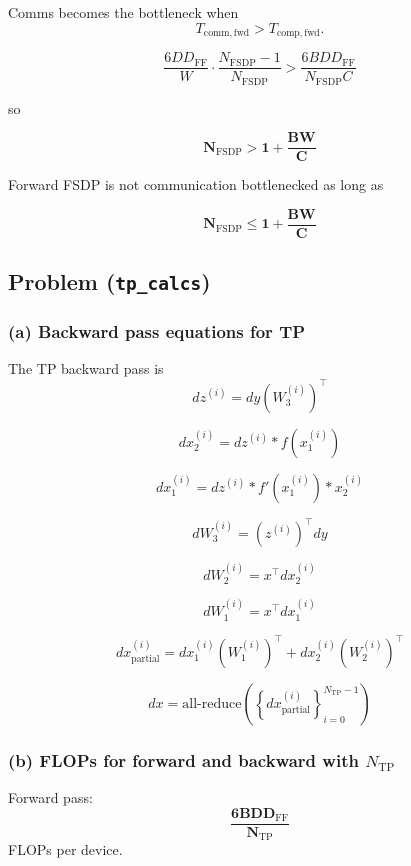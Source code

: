 \documentclass[11pt]{article}
\begin{document}
Comms becomes the bottleneck when
\[
T_{\mathrm{comm,fwd}} > T_{\mathrm{comp,fwd}}.
\]

\[
\frac{6 D D_{\mathrm{FF}}}{W}
\cdot
\frac{N_{\mathrm{FSDP}} - 1}{N_{\mathrm{FSDP}}}
>
\frac{6 B D D_{\mathrm{FF}}}{N_{\mathrm{FSDP}} C}
\]

so

\[
\mathbf{
N_{\mathrm{FSDP}} > 1 + \frac{B W}{C}
}
\]

Forward FSDP is not communication bottlenecked as long as

\[
\mathbf{
N_{\mathrm{FSDP}} \le 1 + \frac{B W}{C}
}
\]

\vspace{4em}


\subsection{Problem (\texttt{tp\_calcs})}

\subsubsection*{(a) Backward pass equations for TP}

The TP backward pass is
\[
d z^{(i)}
=
d y \left(W_3^{(i)}\right)^\top
\]

\[
d x_2^{(i)}
=
d z^{(i)} * f(x_1^{(i)})
\]

\[
d x_1^{(i)}
=
d z^{(i)} * f'(x_1^{(i)}) * x_2^{(i)}
\]

\[
dW_3^{(i)}
=
\left(z^{(i)}\right)^\top d y
\]

\[
dW_2^{(i)}
=
x^\top d x_2^{(i)}
\]

\[
dW_1^{(i)}
=
x^\top d x_1^{(i)}
\]

\[
d x_{\mathrm{partial}}^{(i)}
=
d x_1^{(i)} \left(W_1^{(i)}\right)^\top
+
d x_2^{(i)} \left(W_2^{(i)}\right)^\top
\]

\[
d x
=
\mathrm{all\text{-}reduce}
\left(
\left\{
d x_{\mathrm{partial}}^{(i)}
\right\}_{i=0}^{N_{\mathrm{TP}}-1}
\right)
\]

\vspace{4em}

\subsubsection*{(b) FLOPs for forward and backward with $N_{\text{TP}}$}

Forward pass:
\[
\mathbf{
\frac{6 B D D_{\mathrm{FF}}}{N_{\mathrm{TP}}}
}
\]
FLOPs per device.
\end{document}
